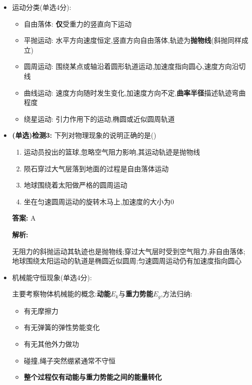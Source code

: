 \documentclass{article}
\begin{document}
\begin{itemize}
        \newpage

    \item 运动分类(单选4分):
          \begin{itemize}
              \item 自由落体: \textbf{仅}受重力的竖直向下运动
              \item 平抛运动: 水平方向速度恒定,竖直方向自由落体,轨迹为\textbf{抛物线}(斜抛同样成立)
              \item 圆周运动: 围绕某点或轴沿着圆形轨道运动,加速度指向圆心,速度方向沿切线
              \item 曲线运动: 速度方向随时发生变化,加速度方向不定,\textbf{曲率半径}描述轨迹弯曲程度
              \item 绕星运动: 引力作用下的运动,椭圆或近似圆周轨道
          \end{itemize}

          \vspace{1em}

    \item[] \textbf{(单选)检测3:} 下列对物理现象的说明正确的是(\qquad)

        \begin{enumerate}[label=\Alph*.]
            \item 运动员投出的篮球,忽略空气阻力影响,其运动轨迹是抛物线
            \item 陨石穿过大气层落到地面的过程是自由落体运动
            \item 地球围绕着太阳做严格的圆周运动
            \item 坐在匀速圆周运动的旋转木马上,加速度的大小为0
        \end{enumerate}

        \textbf{答案:} A

        \textbf{解析:}

        \hspace{2em}无阻力的斜抛运动其轨迹也是抛物线;穿过大气层时受到空气阻力,非自由落体;
        地球围绕太阳运动的轨道是椭圆近似圆周;匀速圆周运动仍有加速度指向圆心

        \vspace{2em}

    \item 机械能守恒现象(单选4分):

          \hspace{2em}主要考察物体机械能的概念:\textbf{动能$E_{k}$}与\textbf{重力势能$E_{g}$},方法归纳:
          \begin{itemize}
              \item 有无摩擦力
              \item 有无弹簧的弹性势能变化
              \item 有无其他外力做功
              \item 碰撞,绳子突然绷紧通常不守恒
              \item \textbf{整个过程仅有动能与重力势能之间的能量转化}
          \end{itemize}


\end{itemize}
\end{document}
